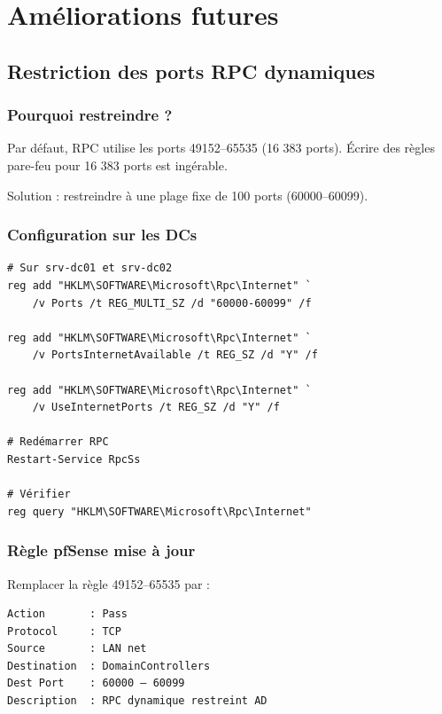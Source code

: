 \chapter{Améliorations futures}

\section{Restriction des ports RPC dynamiques}

\subsection{Pourquoi restreindre ?}

Par défaut, RPC utilise les ports 49152–65535 (16 383 ports). Écrire des règles pare-feu pour 16 383 ports est ingérable.

Solution : restreindre à une plage fixe de 100 ports (60000–60099).

\subsection{Configuration sur les DCs}

\begin{lstlisting}[style=powershell]
# Sur srv-dc01 et srv-dc02
reg add "HKLM\SOFTWARE\Microsoft\Rpc\Internet" `
    /v Ports /t REG_MULTI_SZ /d "60000-60099" /f

reg add "HKLM\SOFTWARE\Microsoft\Rpc\Internet" `
    /v PortsInternetAvailable /t REG_SZ /d "Y" /f

reg add "HKLM\SOFTWARE\Microsoft\Rpc\Internet" `
    /v UseInternetPorts /t REG_SZ /d "Y" /f

# Redémarrer RPC
Restart-Service RpcSs

# Vérifier
reg query "HKLM\SOFTWARE\Microsoft\Rpc\Internet"
\end{lstlisting}

\subsection{Règle pfSense mise à jour}

Remplacer la règle 49152–65535 par :

\begin{lstlisting}
Action       : Pass
Protocol     : TCP
Source       : LAN net
Destination  : DomainControllers
Dest Port    : 60000 – 60099
Description  : RPC dynamique restreint AD
\end{lstlisting}

